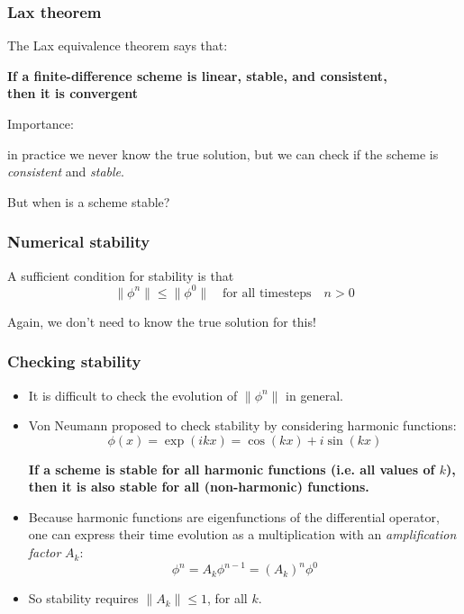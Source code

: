 \documentclass[aspectratio=149,9pt]{beamer}
\begin{document}
\begin{frame}
	\frametitle{Lax theorem}
	The Lax equivalence theorem says that:\\
	\begin{center}
		\bfseries
		If a finite-difference scheme is {linear}, {stable}, and {consistent},\\
		then it is {convergent}
	\end{center}
\pause
	\par\vspace*{4ex}
	Importance: \parbox[t]{.6\textwidth}{in practice we never know the true solution, but we can check if the scheme is \emph{consistent} and \emph{stable}.}
	\par\vspace*{3ex}
	But when is a scheme stable?
\end{frame}
%
%
\begin{frame}
	\frametitle{Numerical stability}
	A sufficient condition for stability is that\vspace*{2ex}
	\begin{equation*}
		\| \phi^n \| \le \| \phi^0 \| \quad \text{for all timesteps} \quad n>0
	\end{equation*}\par\vspace*{5ex}
	Again, we don't need to know the true solution for this!
\end{frame}
%
%
\begin{frame}
	\frametitle{Checking stability}
	\begin{itemize}
		\item It is difficult to check the evolution of $\| \phi^n \|$ in general.\vspace*{2ex}
		\item Von Neumann proposed to check stability by considering harmonic functions:
			\begin{equation*}
				\phi(x)=\exp(ik x)=\cos(kx)+i\sin(kx)
			\end{equation*}
			\begin{center}
				\bfseries
				If a scheme is stable for all harmonic functions (i.e. all values of $k$),\\ then it is also stable for all (non-harmonic) functions.
			\end{center}\vspace*{2ex}
		\item Because harmonic functions are eigenfunctions of the differential operator, one can express their time evolution as a multiplication with an \emph{amplification factor} $A_k$:
			\begin{equation*}
				\phi^{n}=A_k\phi^{n-1}=\left(A_k\right)^n\phi^0
			\end{equation*}\par\vspace*{2ex}
		\item So stability requires $\|A_k\|\leq 1$, for all $k$.
	\end{itemize}
\end{frame}
\end{document}
